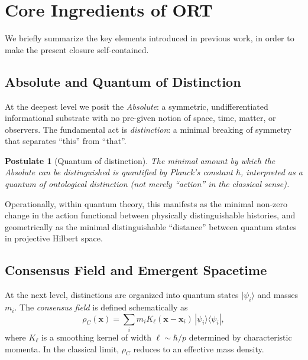 \documentclass[12pt,a4paper]{article}
\newtheorem{postulate}{Postulate}
\begin{document}
\section{Core Ingredients of ORT}
\label{sec:core}

We briefly summarize the key elements introduced in previous work, in order to make the present closure self-contained.

\subsection{Absolute and Quantum of Distinction}
\label{subsec:absolute}

At the deepest level we posit the \emph{Absolute}: a symmetric, undifferentiated informational substrate with no pre-given notion of space, time, matter, or observers. The fundamental act is \emph{distinction}: a minimal breaking of symmetry that separates ``this'' from ``that''.

\begin{postulate}[Quantum of distinction]
The minimal amount by which the Absolute can be distinguished is quantified by Planck's constant $\hbar$, interpreted as a quantum of ontological distinction (not merely ``action'' in the classical sense).
\end{postulate}

Operationally, within quantum theory, this manifests as the minimal non-zero change in the action functional between physically distinguishable histories, and geometrically as the minimal distinguishable ``distance'' between quantum states in projective Hilbert space.

\subsection{Consensus Field and Emergent Spacetime}
\label{subsec:consensus_spacetime}

At the next level, distinctions are organized into quantum states $|\psi_i\rangle$ and masses $m_i$. The \emph{consensus field} is defined schematically as
\begin{equation}
  \rho_C(\mathbf{x}) = \sum_i m_i K_\ell(\mathbf{x} - \mathbf{x}_i)\, |\psi_i\rangle\langle\psi_i|,
\end{equation}
where $K_\ell$ is a smoothing kernel of width $\ell \sim \hbar / p$ determined by characteristic momenta. In the classical limit, $\rho_C$ reduces to an effective mass density.
\end{document}
